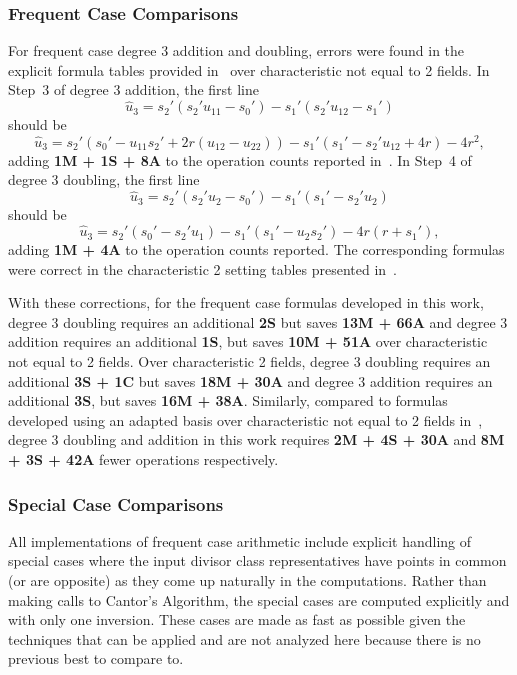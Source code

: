 \subsubsection{Frequent Case Comparisons}
For frequent case degree 3 addition and doubling, errors were found in the
explicit formula tables provided in~\cite{rad2019jacobian} over characteristic
not equal to 2 fields. In Step~3 of degree 3 addition, the first line $$\hat{u}_3
= s_2'(s_2'u_{11} - s_0') - s_1'(s_2'u_{12} - s_1')$$ should be $$\hat{u}_3 =
s_2'(s_0' - u_{11}s_2' + 2r(u_{12} - u_{22})) - s_1'(s_1' - s_2'u_{12} + 4r) -
4r^2,$$ adding \textbf{1M + 1S + 8A} to the operation counts reported
in~\cite{rad2019jacobian}. In Step~4 of degree 3 doubling, the first line
$$\hat{u}_3 = s_2'(s_2'u_2 - s_0') - s_1'(s_1' - s_2'u_2)$$ should be
$$\hat{u}_3 = s_2'(s_0' - s_2'u_1) - s_1'(s_1' - u_2s_2') - 4r(r + s_1'),$$
adding \textbf{1M + 4A} to the operation counts reported. The corresponding
formulas were correct in the characteristic 2 setting tables presented
in~\cite{rad2019jacobian}.

With these corrections, for the frequent case formulas developed in this work,
degree 3 doubling requires an additional \textbf{2S} but saves \textbf{13M +
66A} and degree 3 addition requires an additional \textbf{1S}, but saves
\textbf{10M + 51A} over characteristic not equal to 2 fields. Over
characteristic 2 fields, degree 3 doubling requires an additional \textbf{3S +
1C} but saves \textbf{18M + 30A} and degree 3 addition requires an additional
\textbf{3S}, but saves \textbf{16M + 38A}.  Similarly, compared to formulas
developed using an adapted basis over characteristic not equal to 2 fields
in~\cite{Sutherland_g3_2019}, degree 3 doubling and addition in this work
requires \textbf{2M + 4S + 30A} and \textbf{8M + 3S + 42A} fewer operations
respectively.

\subsubsection{Special Case Comparisons}
All implementations of frequent case arithmetic include explicit handling of
special cases where the input divisor class representatives have points in
common (or are opposite) as they come up naturally in the computations. Rather
than making calls to Cantor's Algorithm, the special cases are computed
explicitly and with only one inversion. These cases are made as fast as possible
given the techniques that can be applied and are not analyzed here because there
is no previous best to compare to.

